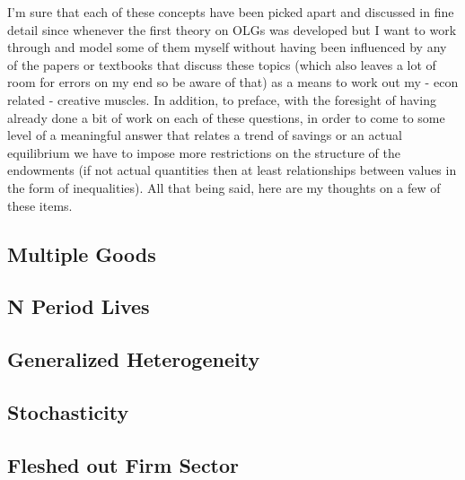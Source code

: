 \documentclass[11pt,english]{article}
\begin{document}
\noindent I'm sure that each of these concepts have been picked apart and discussed in fine detail since whenever the first theory on OLGs was developed but I want to work through and model some of them myself without having been influenced by any of the papers or textbooks that discuss these topics (which also leaves a lot of room for errors on my end so be aware of that) as a means to work out my - econ related - creative muscles. In addition, to preface, with the foresight of having already done a bit of work on each of these questions, in order to come to some level of a meaningful answer that relates a trend of savings or an actual equilibrium we have to impose more restrictions on the structure of the endowments (if not actual quantities then at least relationships between values in the form of inequalities). All that being said, here are my thoughts on a few of these items.

\subsection*{Multiple Goods}

\subsection*{N Period Lives}

\subsection*{Generalized Heterogeneity}

\subsection*{Stochasticity}

\subsection*{Fleshed out Firm Sector}
\end{document}
